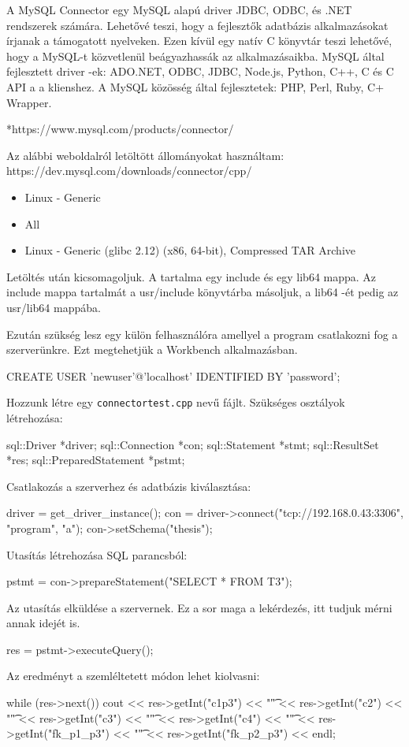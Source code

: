 
A MySQL Connector egy MySQL alapú driver JDBC, ODBC, és .NET rendszerek számára. Lehetővé teszi, hogy a fejlesztők adatbázis alkalmazásokat írjanak a támogatott nyelveken. Ezen kívül egy natív C könyvtár teszi lehetővé, hogy a MySQL-t közvetlenül beágyazhassák az alkalmazásaikba.
MySQL által fejlesztett driver -ek:
ADO.NET, ODBC, JDBC, Node.js, Python, C++, C és C API a a klienshez. 
A MySQL közösség által fejlesztetek:
PHP, Perl, Ruby, C+ Wrapper.

*https://www.mysql.com/products/connector/


Az alábbi weboldalról letöltött állományokat használtam:\newline
https://dev.mysql.com/downloads/connector/cpp/
\begin{itemize}
\item Linux - Generic
\item All
\item Linux - Generic (glibc 2.12) (x86, 64-bit), Compressed TAR Archive
\end{itemize}

Letöltés után kicsomagoljuk. A tartalma egy include és egy lib64 mappa. Az include mappa tartalmát a usr/include könyvtárba másoljuk, a lib64 -ét pedig az usr/lib64 mappába.

Ezután szükség lesz egy külön felhasználóra amellyel a program csatlakozni fog a szerverünkre. Ezt megtehetjük a Workbench alkalmazásban.
\begin{python}
CREATE USER 'newuser'@'localhost' IDENTIFIED BY 'password';
\end{python}


Hozzunk létre egy \texttt{connectortest.cpp} nevű fájlt.
Szükséges osztályok létrehozása:
\begin{cpp}
sql::Driver *driver;
sql::Connection *con;
sql::Statement *stmt;
sql::ResultSet *res;
sql::PreparedStatement *pstmt;
\end{cpp}
Csatlakozás a szerverhez és adatbázis kiválasztása:
\begin{cpp}
driver = get_driver_instance();
con = driver->connect("tcp://192.168.0.43:3306", "program", "a");
con->setSchema("thesis");
\end{cpp}
Utasítás létrehozása SQL parancsból:
\begin{cpp}
pstmt = con->prepareStatement("SELECT * FROM T3");
\end{cpp}
Az utasítás elküldése a szervernek. Ez a sor maga a lekérdezés, itt tudjuk mérni annak idejét is.
\begin{cpp}
res = pstmt->executeQuery();
\end{cpp}
Az eredményt a szemléltetett módon lehet kiolvasni:
\begin{cpp}
 while (res->next())
      cout << res->getInt("c1p3") << "\t" << res->getInt("c2") << "\t"
           << res->getInt("c3") << "\t" << res->getInt("c4") << "\t"
           << res->getInt("fk_p1_p3") << "\t" << res->getInt("fk_p2_p3") 
           << endl;
\end{cpp}

